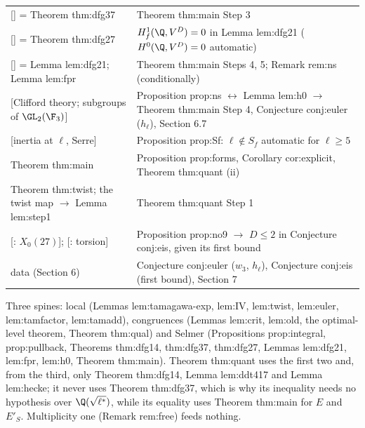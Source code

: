 \begin{sloppypar}
{\begin{longtable}{p{}p{}}
{[}\cite[Theorem 3.7]{DFG04}] = Theorem thm:dfg37 & Theorem thm:main Step 3\\
{[}\cite[Theorem 2.7]{DFG04}] = Theorem thm:dfg27 & $H^1_f(\Q,V^D)=0$ in Lemma lem:dfg21 ($H^0(\Q,V^D)=0$ automatic)\\
{[}\cite[Lemma 2.1]{DFG04}] = Lemma lem:dfg21; Lemma lem:fpr & Theorem thm:main Steps 4, 5; Remark rem:ns (conditionally)\\
{[}Clifford theory; subgroups of $\GL_2(\F_3)$] & Proposition prop:ns $\leftrightarrow$ Lemma lem:h0 $\to$ Theorem thm:main Step 4, Conjecture conj:euler ($h_\ell$), Section 6.7\\
{[}inertia at $\ell$, Serre] & Proposition prop:Sf: $\ell\notin S_f$ automatic for $\ell\ge5$\\
Theorem thm:main & Proposition prop:forms, Corollary cor:explicit, Theorem thm:quant (ii)\\
Theorem thm:twist; the twist map $\to$ Lemma lem:step1 & Theorem thm:quant Step 1\\
{[}\cite{Ligozat75}: $X_0(27)$]; [\cite{Mazur77}: torsion] & Proposition prop:no9 $\to$ $D\le2$ in Conjecture conj:eis, given its first bound\\
data (Section 6) & Conjecture conj:euler ($w_3$, $h_\ell$), Conjecture conj:eis (first bound), Section 7\\
\bottomrule
\end{longtable}}
Three spines: local (Lemmas lem:tamagawa-exp, lem:IV, lem:twist, lem:euler, lem:tamfactor, lem:tamadd), congruences (Lemmas lem:crit, lem:old, the optimal-level theorem,
Theorem thm:qual) and Selmer (Propositions prop:integral, prop:pullback, Theorems thm:dfg14, thm:dfg37, thm:dfg27, Lemmas lem:dfg21, lem:fpr, lem:h0, Theorem thm:main). Theorem thm:quant uses
the first two and, from the third, only Theorem thm:dfg14, Lemma lem:ddt417 and Lemma lem:hecke; it never uses Theorem thm:dfg37, which is why its inequality needs no
hypothesis over $\Q(\sqrt{\ell^*})$, while its equality uses Theorem thm:main for $E$ and $E'_S$. Multiplicity one (Remark rem:free) feeds nothing.


\end{sloppypar}

